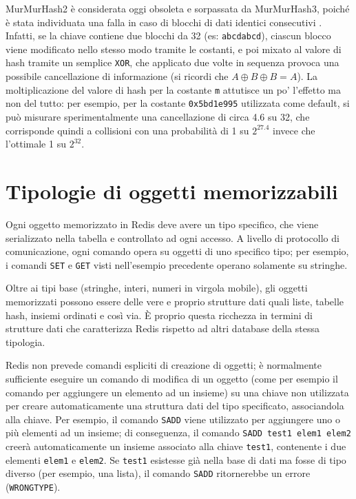 MurMurHash2 è considerata oggi obsoleta e sorpassata da MurMurHash3, poiché è stata individuata una
falla in caso di blocchi di dati identici consecutivi \cite{murmur2flaw}. Infatti, se la chiave
contiene due blocchi da \SI{32}{\bit} (es: \verb|abcdabcd|), ciascun blocco viene modificato nello
stesso modo tramite le costanti, e poi mixato al valore di hash tramite un semplice \verb|XOR|, che
applicato due volte in sequenza provoca una possibile cancellazione di informazione (si ricordi che
$A \oplus B \oplus B = A$). La moltiplicazione del valore di hash per la costante \verb|m| attutisce
un po' l'effetto ma non del tutto: per esempio, per la costante \verb|0x5bd1e995| utilizzata come
default, si può misurare sperimentalmente una cancellazione di circa \SI{4.6}{\bit} su \num{32}, che
corrisponde quindi a collisioni con una probabilità di \num{1} su $2 ^ {27.4}$ invece che l'ottimale
\num{1} su $2 ^ {32}$.

\section{Tipologie di oggetti memorizzabili}

Ogni oggetto memorizzato in Redis deve avere un tipo specifico, che viene serializzato
nella tabella e controllato ad ogni accesso. A livello di protocollo di comunicazione,
ogni comando opera su oggetti di uno specifico tipo; per esempio, i comandi \verb|SET|
e \verb|GET| visti nell'esempio precedente operano solamente su stringhe.

Oltre ai tipi base (stringhe, interi, numeri in virgola mobile), gli oggetti memorizzati
possono essere delle vere e proprio strutture dati quali liste, tabelle hash, insiemi
ordinati e così via. È proprio questa ricchezza in termini di strutture dati che caratterizza
Redis rispetto ad altri database della stessa tipologia.

Redis non prevede comandi espliciti di creazione di oggetti; è normalmente sufficiente
eseguire un comando di modifica di un oggetto (come per esempio il comando per aggiungere
un elemento ad un insieme) su una chiave non utilizzata per creare automaticamente una
struttura dati del tipo specificato, associandola alla chiave. Per esempio, il comando
\verb|SADD| viene utilizzato per aggiungere uno o più elementi ad un insieme; di
conseguenza, il comando \verb|SADD test1 elem1 elem2| creerà automaticamente un insieme 
associato alla chiave \verb|test1|, contenente i due elementi \verb|elem1| e \verb|elem2|.
Se \verb|test1| esistesse già nella base di dati ma fosse di tipo diverso (per esempio,
una lista), il comando \verb|SADD| ritornerebbe un errore (\verb|WRONGTYPE|).

